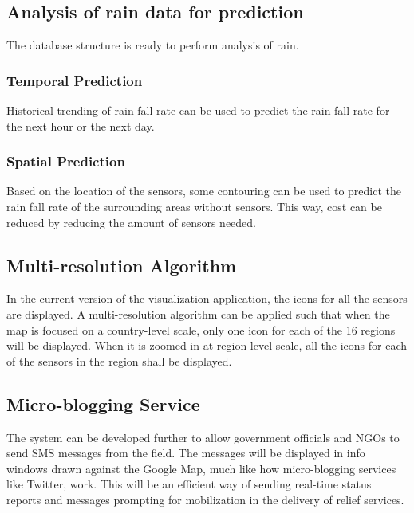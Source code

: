 \subsection{Analysis of rain data for prediction}
The database structure is ready to perform analysis of rain. 

\subsubsection{Temporal Prediction}
Historical trending of rain fall rate can be used to predict the rain fall rate for the next hour or the next day. 

\subsubsection{Spatial Prediction}
Based on the location of the sensors, some contouring can be used to predict the rain fall rate of the surrounding areas without sensors. This way, cost can be reduced by reducing the amount of sensors needed. 

\subsection{Multi-resolution Algorithm}
In the current version of the visualization application, the icons for all the sensors are displayed. A multi-resolution algorithm can be applied such that when the map is focused on a country-level scale, only one icon for each of the 16 regions will be displayed. When it is zoomed in at region-level scale, all the icons for each of the sensors in the region shall be displayed.

\subsection{Micro-blogging Service}
The system can be developed further to allow government officials and NGOs to send SMS messages from the field. The messages will be displayed in info windows drawn against the Google Map, much like how micro-blogging services like Twitter, work. This will be an efficient way of sending real-time status reports and messages prompting for mobilization in the delivery of relief services. 


  